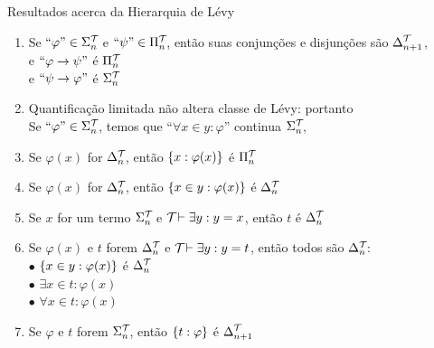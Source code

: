 \begin{theorem}{Resultados acerca da Hierarquia de Lévy}
\begin{enumerate}[label=(\alph*)]
                        \item Se $\text{``}\varphi\text{''}\in\Sigma^{\mathcal{T}_{}}_{n}$ e $\text{``}\psi\text{''}\in\Pi^{\mathcal{T}_{}}_{n}$, então suas conjunções e disjunções
                            são $\Delta^{\mathcal{T}_{}}_{n+1}$,\\ 
                            e $\text{``}\varphi\rightarrow\psi\text{''}$ é $\Pi^{\mathcal{T}_{}}_{n}$\\
                            e $\text{``}\psi\rightarrow\varphi\text{''}$ é $\Sigma^{\mathcal{T}_{}}_{n}$
                        \item Quantificação limitada não altera classe de Lévy: portanto\\
                                Se $\text{``}\varphi\text{''}\in\Sigma^{\mathcal{T}_{}}_{n}$, temos que ``$\forall x\in y:\varphi$'' continua $\Sigma^{\mathcal{T}_{}}_{n}$,
                        \item Se $\varphi(x)$ for         $\Delta^{\mathcal{T}_{}}_{n}$,  então $\SET{x:\varphi(x)}$ é $\Pi^{\mathcal{T}_{}}_{n}$
                        \item Se $\varphi(x)$ for         $\Delta^{\mathcal{T}_{}}_{n}$,  então $\SET{x\in y:\varphi(x)}$ é $\Delta^{\mathcal{T}_{}}_{n}$
                        \item Se $x$ for um termo         $\Sigma^{\mathcal{T}_{}}_{n}$   e $\mathcal{T}_{}\vdash\exists y: y = x$, então $t$ é $\Delta^{\mathcal{T}_{}}_{n}$
                        \item Se $\varphi(x)$ e $t$ forem $\Delta^{\mathcal{T}_{}}_{n}$   e $\mathcal{T}_{}\vdash\exists y: y = t$, então todos são $\Delta^{\mathcal{T}_{}}_{n}$:\\
                                $\bullet$ $\SET{x\in y:\varphi(x)}$ é $\Delta^{\mathcal{T}_{}}_{n}$   \\
                                $\bullet$ $\exists x\in t: \varphi(x)$                          \\
                                $\bullet$ $\forall x\in t: \varphi(x)$                          
                        \item Se $\varphi$ e $t$ forem $\Sigma^{\mathcal{T}_{}}_{n}$, então $\SET{t:\varphi}$ é $\Delta^{\mathcal{T}_{}}_{n+1}$
                        \end{enumerate}
%

\end{theorem}
